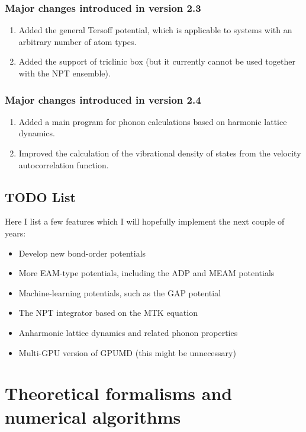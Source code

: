 \documentclass[12pt,a4paper]{report}
\begin{document}
\subsection{Major changes introduced in version 2.3}
\begin{enumerate}
    \item Added the general Tersoff potential, which is applicable to systems with an arbitrary number of atom types.
    \item Added the support of triclinic box (but it currently cannot be used together with the NPT ensemble).
\end{enumerate}

\subsection{Major changes introduced in version 2.4}
\begin{enumerate}
    \item Added a main program for phonon calculations based on harmonic lattice dynamics. 
    \item Improved the calculation of the vibrational density of states from the velocity autocorrelation function.
\end{enumerate}

\section{TODO List}

Here I list a few features which I will hopefully implement the next couple of years:
\begin{itemize}
\item Develop new bond-order potentials
\item More EAM-type potentials, including the ADP and MEAM potentials
\item Machine-learning potentials, such as the GAP potential
\item The NPT integrator based on the MTK equation
\item Anharmonic lattice dynamics and related phonon properties
\item Multi-GPU version of GPUMD (this might be unnecessary)
\end{itemize}


\chapter{Theoretical formalisms and numerical algorithms\label{chapter:theory}}
\end{document}
